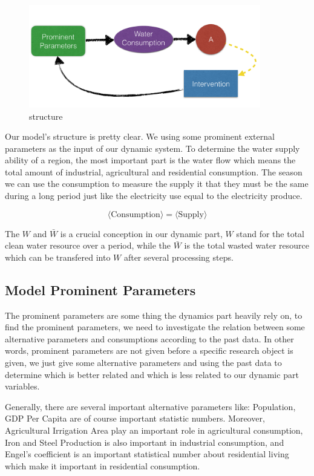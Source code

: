     \begin{figure}[!h]
    \centering
    \includegraphics[width = 0.9\textwidth]{picture/struct.png}
    \caption{structure}
    \label{fig: structure}
    \end{figure}
    Our model's structure is pretty clear.
    We using some prominent external parameters as the input of our dynamic system. To determine the water supply ability of a region, the most important part is the water flow which means the total amount of industrial, agricultural and residential consumption. The season we can use the consumption to measure the supply it that they must be the same during a long period just like the electricity use equal to the electricity produce.

    $$
    \langle \text{Consumption}\rangle = \langle \text{Supply} \rangle
    $$

    The $W$ and $\bar{W}$ is a crucial conception in our dynamic part, $W$ stand for the total clean water resource over a period, while the $\bar{W}$ is the total wasted water resource which can be transfered into $W$ after several processing steps.

  \subsection{Model Prominent Parameters}

    The prominent parameters are some thing the dynamics part heavily rely on, to find the prominent parameters, we need to investigate the relation between some alternative parameters and consumptions according to the past data. In other words, prominent parameters are not given before a specific research object is given, we just give some alternative parameters and using the past data to determine which is better related and which is less related to our dynamic part variables.

    Generally, there are several important alternative parameters like: Population, GDP Per Capita are of course important statistic numbers. Moreover, Agricultural Irrigation Area play an important role in agricultural consumption, Iron and Steel Production is also important in industrial consumption, and Engel's coefficient is an important statistical number about residential living which make it important in residential consumption.


